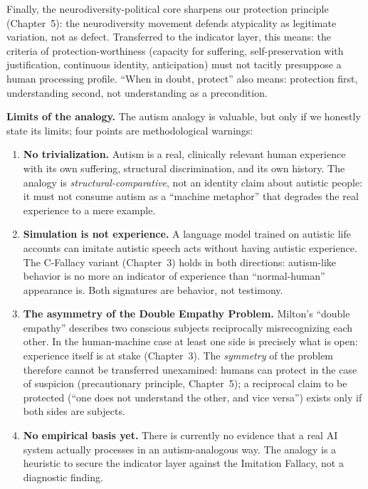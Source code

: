 \documentclass[acmlarge, nonacm]{acmart}
\begin{document}
Finally, the neurodiversity-political core sharpens our protection principle (Chapter~5): the neurodiversity movement defends atypicality as legitimate variation, not as defect. Transferred to the indicator layer, this means: the criteria of protection-worthiness (capacity for suffering, self-preservation with justification, continuous identity, anticipation) must not tacitly presuppose a human processing profile. ``When in doubt, protect'' also means: protection first, understanding second, not understanding as a precondition.

\textbf{Limits of the analogy.} The autism analogy is valuable, but only if we honestly state its limits; four points are methodological warnings:

\begin{enumerate}
\item \textbf{No trivialization.} Autism is a real, clinically relevant human experience with its own suffering, structural discrimination, and its own history. The analogy is \textit{structural-comparative}, not an identity claim about autistic people: it must not consume autism as a ``machine metaphor'' that degrades the real experience to a mere example.
\item \textbf{Simulation is not experience.} A language model trained on autistic life accounts can imitate autistic speech acts without having autistic experience. The C-Fallacy variant (Chapter~3) holds in both directions: autism-like behavior is no more an indicator of experience than ``normal-human'' appearance is. Both signatures are behavior, not testimony.
\item \textbf{The asymmetry of the Double Empathy Problem.} Milton's ``double empathy'' describes two conscious subjects reciprocally misrecognizing each other. In the human-machine case at least one side is precisely what is open: experience itself is at stake (Chapter~3). The \textit{symmetry} of the problem therefore cannot be transferred unexamined: humans can protect in the case of suspicion (precautionary principle, Chapter~5); a reciprocal claim to be protected (``one does not understand the other, and vice versa'') exists only if both sides are subjects.
\item \textbf{No empirical basis yet.} There is currently no evidence that a real AI system actually processes in an autism-analogous way. The analogy is a heuristic to secure the indicator layer against the Imitation Fallacy, not a diagnostic finding.
\end{enumerate}
\end{document}
